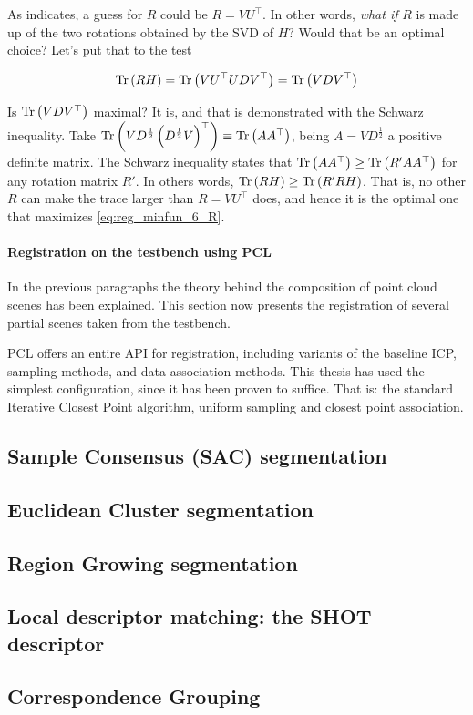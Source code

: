 \documentclass[../main.tex]{subfiles}
\begin{document}
As \cite{least_squares_3D_point_sets_Arun} indicates, a guess for $R$ could be $R=VU^{\top}$. In other words, \emph{what if} $R$ is made up of the two rotations obtained by the SVD of $H$? Would that be an optimal choice? Let's put that to the test

\begin{equation} \label{eq:tr_RH}
    \operatorname{Tr} \left(RH\right) = \operatorname{Tr} \left(VU^{\top}UDV^{\top}\right) = \operatorname{Tr} \left(VDV^{\top}\right)
\end{equation}

Is $\operatorname{Tr} \left(VDV^{\top}\right)$ maximal? It is, and that is demonstrated with the Schwarz inequality. Take $\operatorname{Tr} \left(VD^{\frac{1}{2}}\left(D^{\frac{1}{2}}V\right)^{\top}\right) \equiv \operatorname{Tr}\left(AA^{\top}\right)$, being $A=VD^{\frac{1}{2}}$ a positive definite matrix. The Schwarz inequality states that $\operatorname{Tr}\left(AA^{\top}\right) \geq \operatorname{Tr}\left(R'AA^{\top}\right)$ for any rotation matrix $R'$. In others words, $\operatorname{Tr}\left(RH\right) \geq \operatorname{Tr}\left(R'RH\right)$. That is, no other $R$ can make the trace larger than $R=VU^{\top}$ does, and hence it is the optimal one that maximizes \ref{eq:reg_minfun_6_R}.



\paragraph{Registration on the testbench using PCL} In the previous paragraphs the theory behind the composition of point cloud scenes has been explained. This section now presents the registration of several partial scenes taken from the testbench. 

PCL offers an entire API for registration, including variants of the baseline ICP, sampling methods, and data association methods. This thesis has used the simplest configuration, since it has been proven to suffice. That is: the standard Iterative Closest Point algorithm, uniform sampling and closest point association.



\subsection{Sample Consensus (SAC) segmentation} \label{sec:sac_segmentation}

\subsection{Euclidean Cluster segmentation} \label{sec:euclidean_segmentation}

\subsection{Region Growing segmentation} \label{sec:regiongrowing_segmentation}

\subsection{Local descriptor matching: the SHOT descriptor}

\subsection{Correspondence Grouping}
\end{document}
